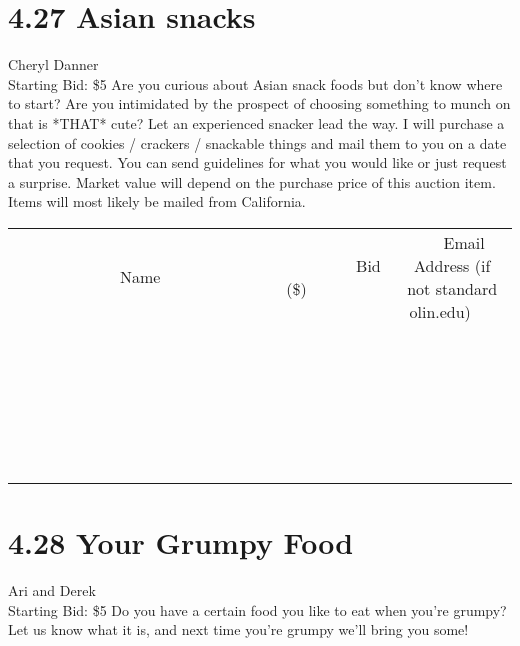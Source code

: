 \documentclass[11pt]{article}
\begin{document}
\section*{4.27 Asian snacks}
Cheryl Danner
\\
Starting Bid: \$5
\newline
Are you curious about Asian snack foods but don't know where to start? Are you intimidated by the prospect of choosing something to munch on that is *THAT* cute? Let an experienced snacker lead the way. I will purchase a selection of cookies / crackers / snackable things and mail them to you on a date that you request. You can send guidelines for what you would like or just request a surprise. Market value will depend on the purchase price of this auction item. Items will most likely be mailed from California.
\\[6ex]
\begin{tabular}{c c c}
~~~~~~~~~~~~~Name~~~~~~~~~~~~~ & ~~~~~~~~~Bid (\$)~~~~~~~~~  & ~~~Email Address (if not standard olin.edu)~~~\\
 & & \\
\hline
 & & \\
\hline
 & & \\
\hline
 & & \\
\hline
 & & \\
\hline
 & & \\
\hline
 & & \\
\hline
 & & \\
\hline
 & & \\
\hline
 & & \\
\hline
 & & \\
\hline
 & & \\
\hline
 & & \\
\hline
 & & \\
\hline
 & & \\
\hline
 & & \\
\hline
 & & \\
\hline
 & & \\
\hline
 & & \\
\hline
 & & \\
\hline
 & & \\
\hline
 & & \\
\hline
 & & \\
\hline
 & & \\
\hline
 & & \\
\hline
 & & \\
\hline
\end{tabular}
\newpage
\section*{4.28 Your Grumpy Food}
Ari and Derek
\\
Starting Bid: \$5
\newline
Do you have a certain food you like to eat when you're grumpy? Let us know what it is, and next time you're grumpy we'll bring you some!
\end{document}
